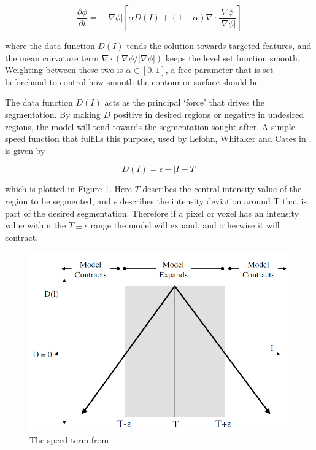 	\begin{equation}
	\frac{\partial{\phi}}{\partial{t}}=-|\nabla{\phi}|\left[\alpha D(I)  + (1-\alpha)\nabla \cdot{\frac{\nabla{\phi}}{|\nabla{\phi|}}}\right]
	\label{eq:fulllevelsetequation}
	\end{equation}

where the data function $D(I)$ tends the solution towards targeted features, and the mean curvature term $\nabla \cdot{(\nabla{\phi}/|\nabla{\phi|})}$ keeps the level set function smooth. Weighting between these two is $\alpha \in [0,1]$, a free parameter that is set beforehand to control how smooth the contour or surface should be.

The data function $D(I)$ acts as the principal `force' that drives the segmentation. By making $D$ positive in desired regions or negative in undesired regions, the model will tend towards the segmentation sought after. A simple speed function that fulfills this purpose, used by Lefohn, Whitaker and Cates in \cite{Lefohn04astreaming, gist}, is given by

	\begin{equation}
	D(I)= \epsilon - |I-T|
	\label{eq:dataterm}
	\end{equation}

which is plotted in Figure \ref{fig:speedterm}. Here $T$ describes the central intensity value of the region to be segmented, and $\epsilon$ describes the intensity deviation around T that is part of the desired segmentation. Therefore if a pixel or voxel has an intensity value within the $T\pm\epsilon$ range the model will expand, and otherwise it will contract. 

	\begin{figure}[h]
		\centering
			\includegraphics[scale=0.3]{images/speedterm.png}
		\caption{The speed term from \cite{gist}}
		\label{fig:speedterm}
	\end{figure}

